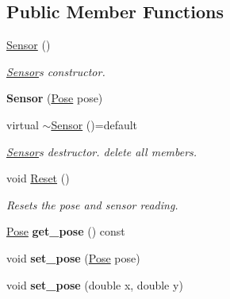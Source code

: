\subsection*{Public Member Functions}
\begin{DoxyCompactItemize}
\item 
\hyperlink{classSensor_a342d6d11ef572c8cba92cb76fb1a294b}{Sensor} ()
\begin{DoxyCompactList}\small\item\em \hyperlink{classSensor}{Sensor}\textquotesingle{}s constructor. \end{DoxyCompactList}\item 
{\bfseries Sensor} (\hyperlink{structPose}{Pose} pose)\hypertarget{classSensor_a0f629f161f0916c70025a8bfe829f57a}{}\label{classSensor_a0f629f161f0916c70025a8bfe829f57a}

\item 
virtual \hyperlink{classSensor_a387919f060b66074dbd107ed1764f8f6}{$\sim$\+Sensor} ()=default\hypertarget{classSensor_a387919f060b66074dbd107ed1764f8f6}{}\label{classSensor_a387919f060b66074dbd107ed1764f8f6}

\begin{DoxyCompactList}\small\item\em \hyperlink{classSensor}{Sensor}\textquotesingle{}s destructor. {\ttfamily delete} all members. \end{DoxyCompactList}\item 
void \hyperlink{classSensor_ae7142e59234c594e21de26467733a279}{Reset} ()\hypertarget{classSensor_ae7142e59234c594e21de26467733a279}{}\label{classSensor_ae7142e59234c594e21de26467733a279}

\begin{DoxyCompactList}\small\item\em Resets the pose and sensor reading. \end{DoxyCompactList}\item 
\hyperlink{structPose}{Pose} {\bfseries get\+\_\+pose} () const \hypertarget{classSensor_ad546b1b5d28a15b004d9143d95aea28e}{}\label{classSensor_ad546b1b5d28a15b004d9143d95aea28e}

\item 
void {\bfseries set\+\_\+pose} (\hyperlink{structPose}{Pose} pose)\hypertarget{classSensor_a2d82072c0e2cb2e4663993eea261ea5f}{}\label{classSensor_a2d82072c0e2cb2e4663993eea261ea5f}

\item 
void {\bfseries set\+\_\+pose} (double x, double y)\hypertarget{classSensor_ab5b28f61907c916f77a9959b169b5361}{}\label{classSensor_ab5b28f61907c916f77a9959b169b5361}


\end{DoxyCompactItemize}
